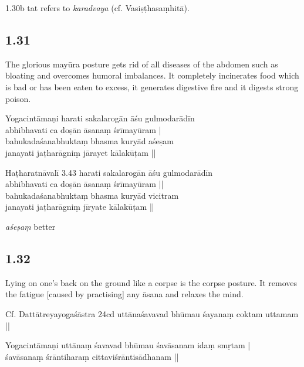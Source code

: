 \begin{ekdosis}
\begin{philcomm}[hp01_030]
1.30b tat refers to \emph{karadvaya} (cf. Vasiṣṭhasaṃhitā).
\end{philcomm}

\subsection*{1.31}
\begin{translation}[hp01_031]
The glorious mayūra posture gets rid of all diseases of the abdomen such as bloating and overcomes humoral imbalances. It completely incinerates food which is bad or has been eaten to excess, it generates digestive fire and it digests strong poison.
\end{translation}

\begin{testimonia}[hp01_031]
Yogacintāmaṇi
\startverse
harati sakalarogān āśu gulmodarādīn\\
abhibhavati ca doṣān āsanaṃ śrīmayūram |\\
bahukadaśanabhuktaṃ bhasma kuryād aśeṣam\\
janayati jaṭharāgniṃ jārayet kālakūṭam ||
\endverse

Haṭharatnāvalī 3.43
\startverse
harati sakalarogān āśu gulmodarādīn\\
abhibhavati ca doṣān āsanaṃ śrīmayūram ||\\
bahukadaśanabhuktaṃ bhasma kuryād vicitram\\
janayati jaṭharāgniṃ jīryate kālakūṭam ||
\endverse
\end{testimonia}

\begin{philcomm}[hp01_031]
\emph{aśeṣaṃ} better
\end{philcomm}

\subsection*{1.32}
\begin{translation}[hp01_032]
Lying on one’s back on the ground like a corpse is the corpse posture. It removes the fatigue [caused by practising] any āsana and relaxes the mind.
\end{translation}

\begin{sources}[hp01_032]
Cf. Dattātreyayogaśāstra 24cd
\startverse
uttānaśavavad bhūmau śayanaṃ coktam uttamam ||
\endverse
\end{sources}

\begin{testimonia}[hp01_032]
Yogacintāmaṇi
\startverse
uttānaṃ śavavad bhūmau śavāsanam idaṃ smṛtam |\\
śavāsanaṃ śrāntiharaṃ cittaviśrāntisādhanam ||
\endverse


\end{testimonia}
\end{ekdosis}
